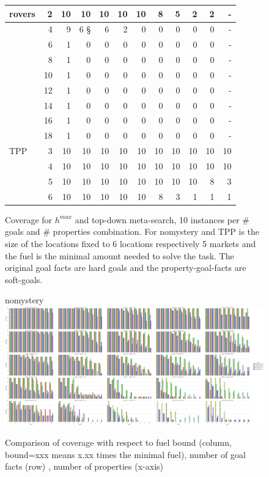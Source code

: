 \begin{figure}[ht]
\begin{tabular}{l|r|rrrrrrrrrr}
		rovers & 2 & 10 & 10 & 10 & 10 & 10 & 8 & 5 & 2 & 2 &- \\\hline
				& 4 & 9 & 6 § & 6 & 2 & 0 & 0 & 0 & 0 & 0 & - \\\hline
				& 6 & 1 & 0 & 0 & 0 & 0 & 0 & 0 & 0 & 0 & - \\\hline 
				& 8 & 1 & 0 & 0 & 0 & 0 & 0 & 0 & 0 & 0 & - \\\hline 
				& 10 & 1 & 0 & 0 & 0 & 0 & 0 & 0 & 0 & 0 & - \\\hline 
				& 12 & 1 & 0 & 0 & 0 & 0 & 0 & 0 & 0 & 0 & - \\\hline 
				& 14 & 1 & 0 & 0 & 0 & 0 & 0 & 0 & 0 & 0 & - \\\hline 
				& 16 & 1 & 0 & 0 & 0 & 0 & 0 & 0 & 0 & 0 & - \\\hline 
				& 18 & 1 & 0 & 0 & 0 & 0 & 0 & 0 & 0 & 0 & - \\\hline\hline
		TPP & 3 & 10 & 10 & 10 & 10 & 10 & 10 & 10 & 10 & 10 & 10\\\hline
			& 4 & 10 & 10 & 10 & 10 & 10 & 10 & 10 & 10 & 10 & 10\\\hline
			& 5 & 10 & 10 & 10 & 10 & 10 & 10 & 10 & 10 & 8 & 3\\\hline
			& 6 & 10 & 10 & 10 & 10 & 10 & 8 & 3 & 1 & 1 & 1\\\hline


	\end{tabular}
	\caption{Coverage for $h^{max}$ and top-down meta-search, 10 instances per \# goals and \# properties combination.
	For nomystery and TPP is the size of the locations fixed to 6 locations respectively 5 markets and the fuel is the 
	minimal amount needed to solve the task.
	The original goal facts are hard goals and the property-goal-facts are soft-goals.}
\end{figure}


\begin{figure}[ht]
	\centering
	nomystery
	\includegraphics[scale=0.2]{data/action_set_properties/coverage_nomystery.pdf}
	\caption{Comparison of coverage with respect to fuel bound (column, bound=xxx means x.xx times the minimal fuel), number of goal facts (row)
		, number of properties (x-axis)}
\end{figure}
